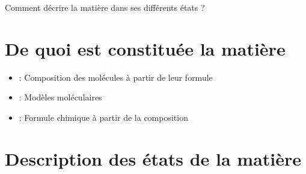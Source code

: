 \documentclass[12pt,a4paper]{article}
\date{}
\title{}
\begin{document}
	
	



\begin{mypb}
	\begin{center}
		{\Large Comment décrire la matière dans ses différents états ?}
	\end{center}
\end{mypb}


\section{De quoi est constituée la matière}








\begin{myexos}
	\begin{itemize}
		\item {} : Composition des molécules à partir de leur formule
		\item {} : Modèles moléculaires
		\item {} : Formule chimique à partir de la composition
	\end{itemize}
\end{myexos}

\section{Description des états de la matière}




\end{document}
